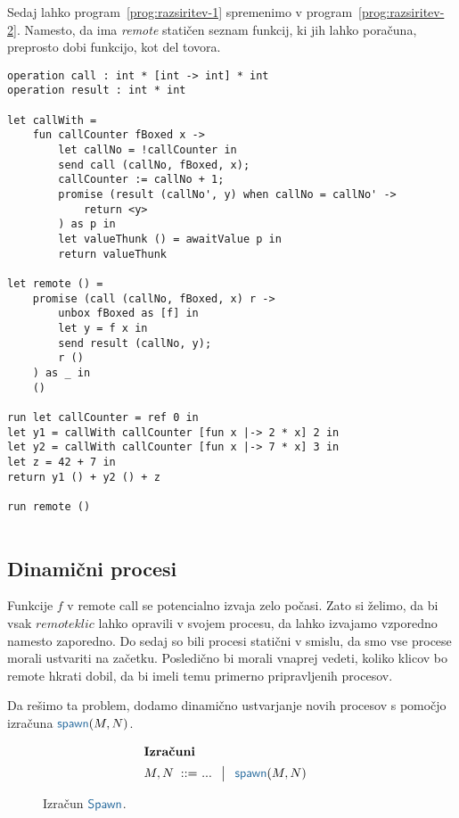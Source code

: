 Sedaj lahko program~\ref{prog:razsiritev-1} spremenimo v program~\ref{prog:razsiritev-2}. Namesto, da ima \emph{remote} statičen seznam funkcij, ki jih lahko poračuna, preprosto dobi funkcijo, kot del tovora.  

\begin{lstlisting}[caption={Računanje zahtevne funkcije v ozadju.},label={prog:razsiritev-1},float,floatplacement=h]
operation call : int * [int -> int] * int
operation result : int * int

let callWith =
	fun callCounter fBoxed x ->
		let callNo = !callCounter in
		send call (callNo, fBoxed, x);
		callCounter := callNo + 1;
		promise (result (callNo', y) when callNo = callNo' ->
			return <y>
		) as p in
		let valueThunk () = awaitValue p in
		return valueThunk

let remote () =
	promise (call (callNo, fBoxed, x) r ->
		unbox fBoxed as [f] in
		let y = f x in
		send result (callNo, y);
		r ()
	) as _ in
	()

run	let callCounter = ref 0 in
let y1 = callWith callCounter [fun x |-> 2 * x] 2 in
let y2 = callWith callCounter [fun x |-> 7 * x] 3 in
let z = 42 + 7 in
return y1 () + y2 () + z

run remote ()
	
\end{lstlisting}

\subsection{Dinamični procesi}

Funkcije $f$ v remote call se potencialno izvaja zelo počasi. Zato si želimo, da bi vsak $remote klic$ lahko opravili v svojem procesu, da lahko izvajamo vzporedno namesto zaporedno. 
Do sedaj so bili procesi statični v smislu, da smo vse procese morali ustvariti na začetku.
Posledično bi morali vnaprej vedeti, koliko klicov bo remote hkrati dobil, da bi imeli temu primerno pripravljenih procesov.

Da rešimo ta problem, dodamo dinamično ustvarjanje novih procesov s pomočjo izračuna $\tmspawn{M}{N}$. 



\begin{figure}[H]	
	\centering
	\small
	\begin{align*}
	\shortintertext{\textbf{Izračuni}}
	M, N
	\bnfis & ... \,\bnfor\! \tmspawn{M}{N}
	\end{align*}
	
	\caption{Izračun $\tmkw{Spawn}$.}
	\label{fig:izračun-spawn}
\end{figure}


